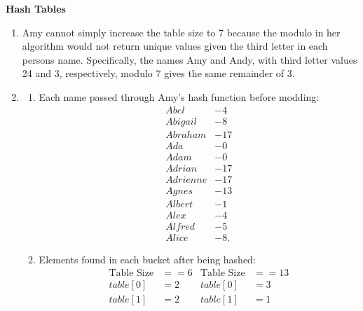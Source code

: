 \documentclass[12pt, letterpaper]{article}
\begin{document}

\noindent{\today}

\vspace{0.2in}


\begin{center}
	\textbf{Hash Tables}
\end{center}
\vspace{0.1in}

\begin{enumerate}
	\item Amy cannot simply increase the table size to 7 because the modulo in her algorithm would not return unique values given the third letter in each persons name. Specifically, the names Amy and Andy, with third letter values 24 and 3, respectively, modulo 7 gives the same remainder of 3. 
	\item 
		\begin{enumerate}
			\item Each name passed through Amy's hash function before modding:
				\begin{align*} 
					Abel &- 4\\ 
					Abigail &- 8\\ 
					Abraham &- 17\\  
					Ada &- 0\\ 
					Adam &- 0\\ 
					Adrian &- 17\\ 
					Adrienne &- 17\\ 
					Agnes &- 13\\ 
					Albert &- 1\\ 
					Alex &- 4\\ 
					Alfred &- 5\\ 
					Alice &- 8.
				\end{align*}
			\item Elements found in each bucket after being hashed:
				\begin{align*}
					\text{Table Size} &== 6       &        \text{Table Size} &==13 \\
					table[0] &= 2		& 	table[0] &= 3    \\
					table[1] &= 2		& 	table[1] &= 1    \\

\end{align*}
\end{enumerate}
\end{enumerate}
\end{document}
